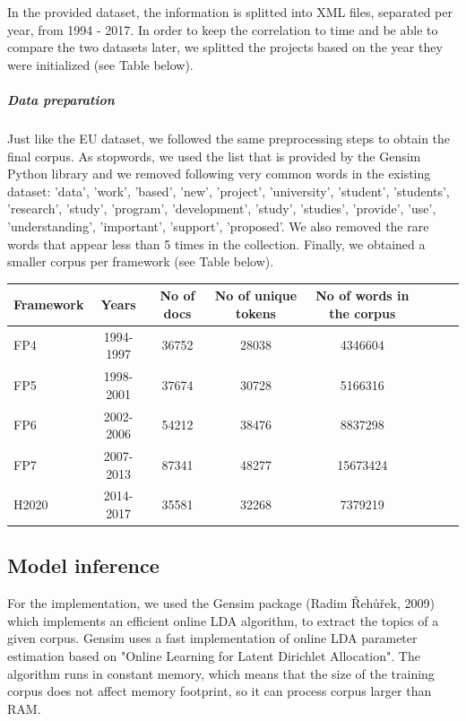 \documentclass[12pt]{report}
\begin{document}
In the provided dataset, the information is splitted into XML files, separated per year, from 1994 - 2017. In order to keep the correlation to time and be able to compare the two datasets later, we splitted the projects based on the year they were initialized (see Table below).

\subparagraph{Data preparation}

Just like the EU dataset, we followed the same preprocessing steps to obtain the final corpus. As stopwords, we used the list that is provided by the Gensim Python library and we removed following very common words in the existing dataset: 'data', 'work', 'based', 'new', 'project', 'university', 'student', 'students', 'research', 'study', 'program', 'development', 'study', 'studies', 'provide', 'use', 'understanding', 'important', 'support', 'proposed'. We also removed the rare words that appear less than 5 times in the collection. Finally, we obtained a smaller corpus per framework (see Table below).

\begin{center}
\begin{tabular}{l*{6}{c}r}
Framework         & Years & No of docs & No of unique tokens & No of words in the corpus \\
\hline
FP4 & 1994-1997 & 36752 & 28038 & 4346604 \\
FP5 & 1998-2001 & 37674 & 30728 & 5166316 \\
FP6 & 2002-2006 & 54212 & 38476 & 8837298 \\
FP7 & 2007-2013 & 87341 & 48277 & 15673424 \\
H2020 & 2014-2017 & 35581 & 32268 & 7379219 \\
\end{tabular}
\end{center}

\subsection{Model inference}

For the implementation, we used the Gensim package (Radim Řehůřek,
2009)\cite{rehurek_lrec} which implements an efficient online LDA algorithm, to
extract the topics of a given corpus. Gensim uses a fast implementation of
online LDA parameter estimation based on "Online Learning for Latent Dirichlet
Allocation".\cite{onlineLDAvb} The algorithm runs in constant memory, which
means that the size of the training corpus does not affect memory footprint, so
it can process corpus larger than RAM.
\end{document}
